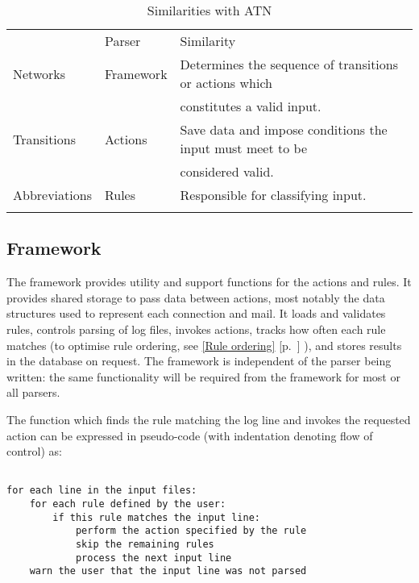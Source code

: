 \documentclass[draft]{svmult}
\newcommand{\refwithpage}[1]{%
    \empty{}\ref{#1} [p.~\pageref{#1}]%
}
\newcommand{\sectionref}[1]{%
    \textsection{}\refwithpage{#1}%
}
\begin{document}

\begin{table}[ht]
    \caption{Similarities with ATN}\label{Similarities with ATN}
    \begin{tabular}[]{lll}
        \hline
        \noalign{\smallskip}
        \ATN{}        & Parser    & Similarity                          \\
        \noalign{\smallskip}
        \hline
        \noalign{\smallskip}
        Networks      & Framework & Determines the sequence of
                                    transitions or actions which        \\
                      &           & constitutes a valid input.          \\
        Transitions   & Actions   & Save data and impose conditions the
                                    input must meet to be               \\
                      &           & considered valid.                   \\
        Abbreviations & Rules     & Responsible for classifying input.  \\
        \noalign{\smallskip}
        \hline
        \noalign{\smallskip}
    \end{tabular}
\end{table}

\subsection{Framework}

\label{Framework}

The framework provides utility and support functions for the actions and
rules.  It provides shared storage to pass data between actions, most
notably the data structures used to represent each connection and mail.
It loads and validates rules, controls
parsing of log files, invokes actions, tracks how often each rule matches
(to optimise rule ordering, see \sectionref{Rule ordering}), and
stores results in the database on request.  The framework is independent of
the parser being written: the same functionality will be required from the
framework for most or all parsers.

The function which finds the rule matching the log line and invokes the
requested action can be expressed in pseudo-code (with indentation denoting
flow of control) as:

\begin{verbatim}

for each line in the input files:
    for each rule defined by the user:
        if this rule matches the input line:
            perform the action specified by the rule
            skip the remaining rules
            process the next input line
    warn the user that the input line was not parsed

\end{verbatim}
\end{document}

